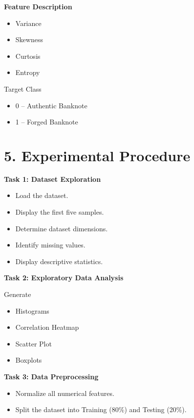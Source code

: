 \documentclass[11pt]{article}
\begin{document}
\textbf{Feature Description}

\begin{itemize}
\item Variance
\item Skewness
\item Curtosis
\item Entropy
\end{itemize}

Target Class

\begin{itemize}
\item 0 -- Authentic Banknote
\item 1 -- Forged Banknote
\end{itemize}


\section*{5. Experimental Procedure}

\textbf{Task 1: Dataset Exploration}

\begin{itemize}
\item Load the dataset.
\item Display the first five samples.
\item Determine dataset dimensions.
\item Identify missing values.
\item Display descriptive statistics.
\end{itemize}

\vspace{2mm}

\textbf{Task 2: Exploratory Data Analysis}

Generate

\begin{itemize}
\item Histograms
\item Correlation Heatmap
\item Scatter Plot
\item Boxplots
\end{itemize}

\vspace{2mm}

\textbf{Task 3: Data Preprocessing}

\begin{itemize}
\item Normalize all numerical features.
\item Split the dataset into Training (80\%) and Testing (20\%).
\end{itemize}
\end{document}
